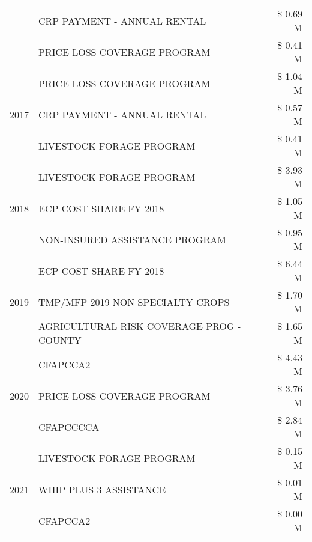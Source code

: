 \begin{tabular}{llr}
 & CRP PAYMENT - ANNUAL RENTAL & \$ 0.69 M \\
 & PRICE LOSS COVERAGE PROGRAM & \$ 0.41 M \\
\cline{1-3}
\multirow[t]{3}{*}{2017} & PRICE LOSS COVERAGE PROGRAM & \$ 1.04 M \\
 & CRP PAYMENT - ANNUAL RENTAL & \$ 0.57 M \\
 & LIVESTOCK FORAGE PROGRAM & \$ 0.41 M \\
\cline{1-3}
\multirow[t]{3}{*}{2018} & LIVESTOCK FORAGE PROGRAM & \$ 3.93 M \\
 & ECP COST SHARE FY 2018 & \$ 1.05 M \\
 & NON-INSURED ASSISTANCE PROGRAM & \$ 0.95 M \\
\cline{1-3}
\multirow[t]{3}{*}{2019} & ECP COST SHARE FY 2018 & \$ 6.44 M \\
 & TMP/MFP 2019 NON SPECIALTY CROPS & \$ 1.70 M \\
 & AGRICULTURAL RISK COVERAGE PROG - COUNTY & \$ 1.65 M \\
\cline{1-3}
\multirow[t]{3}{*}{2020} & CFAPCCA2 & \$ 4.43 M \\
 & PRICE LOSS COVERAGE PROGRAM & \$ 3.76 M \\
 & CFAPCCCCA & \$ 2.84 M \\
\cline{1-3}
\multirow[t]{3}{*}{2021} & LIVESTOCK FORAGE PROGRAM & \$ 0.15 M \\
 & WHIP PLUS 3 ASSISTANCE & \$ 0.01 M \\
 & CFAPCCA2 & \$ 0.00 M \\
\cline{1-3}
\bottomrule
\end{tabular}
